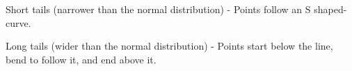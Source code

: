 \begin{frame}
{
Short tails (narrower than the normal distribution) - Points follow an S shaped-curve.
}

{
Long tails (wider than the normal distribution) - Points start below the line, bend to follow it, and end above it.
}

\end{frame}

